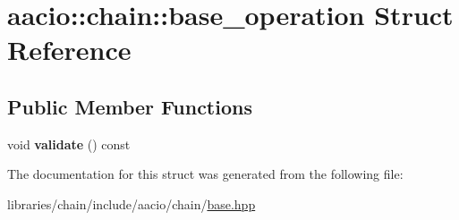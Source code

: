 \hypertarget{structaacio_1_1chain_1_1base__operation}{}\section{aacio\+:\+:chain\+:\+:base\+\_\+operation Struct Reference}
\label{structaacio_1_1chain_1_1base__operation}
\subsection*{Public Member Functions}
\begin{DoxyCompactItemize}
\item 
\mbox{\label{structaacio_1_1chain_1_1base__operation_a77d5970a99d12368c77440d7cb142990}} 
void {\bfseries validate} () const
\end{DoxyCompactItemize}


The documentation for this struct was generated from the following file\+:\begin{DoxyCompactItemize}
\item 
libraries/chain/include/aacio/chain/\mbox{\hyperlink{chain_2include_2aacio_2chain_2base_8hpp}{base.\+hpp}}\end{DoxyCompactItemize}
